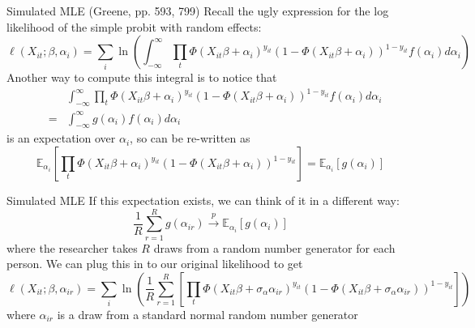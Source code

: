 \documentclass[english,xcolor=dvipsnames]{beamer}
\begin{document}
\begin{frame}{Simulated MLE (Greene, pp. 593, 799)}
Recall the ugly expression for the log likelihood of the simple probit with random effects:
\begin{equation*}
\ell(X_{it};\beta,\alpha_{i})=\sum_{i}\ln\left(\int_{-\infty}^{\infty}\prod_{t}\Phi\left(X_{it}\beta+\alpha_{i}\right)^{y_{it}}\left(1-\Phi\left(X_{it}\beta+\alpha_{i}\right)\right)^{1-y_{it}}f\left(\alpha_{i}\right)d\alpha_{i}\right)
\end{equation*}
Another way to compute this integral is to notice that  
\begin{eqnarray*}
 & & \int_{-\infty}^{\infty}\prod_{t}\Phi\left(X_{it}\beta+\alpha_{i}\right)^{y_{it}}\left(1-\Phi\left(X_{it}\beta+\alpha_{i}\right)\right)^{1-y_{it}}f\left(\alpha_{i}\right)d\alpha_{i}\\
&=&\int_{-\infty}^{\infty}g\left(\alpha_{i}\right)f\left(\alpha_{i}\right)d\alpha_{i}
\end{eqnarray*}
is an expectation over $\alpha_{i}$, so can be re-written as
\[
\mathbb{E}_{\alpha_{i}}\left[\prod_{t}\Phi\left(X_{it}\beta+\alpha_{i}\right)^{y_{it}}\left(1-\Phi\left(X_{it}\beta+\alpha_{i}\right)\right)^{1-y_{it}}\right] = \mathbb{E}_{\alpha_{i}}\left[g\left(\alpha_{i}\right)\right]
\]
\end{frame}

\begin{frame}{Simulated MLE}
If this expectation exists, we can think of it in a different way:
\begin{equation*}
\frac{1}{R}\sum_{r=1}^{R}g\left(\alpha_{ir}\right) \overset{p}{\rightarrow} \mathbb{E}_{\alpha_{i}}\left[g\left(\alpha_{i}\right)\right]
\end{equation*}
where the researcher takes $R$ draws from a random number generator for each person. We can plug this in to our original likelihood to get
\begin{equation*}
\ell(X_{it};\beta,\alpha_{ir})=\sum_{i}\ln\left(\frac{1}{R}\sum_{r=1}^{R}\left[\prod_{t}\Phi\left(X_{it}\beta+\sigma_{\alpha}\alpha_{ir}\right)^{y_{it}}\left(1-\Phi\left(X_{it}\beta+\sigma_{\alpha}\alpha_{ir}\right)\right)^{1-y_{it}}\right]\right)
\end{equation*}
where $\alpha_{ir}$ is a draw from a standard normal random number generator
\end{frame}
\end{document}
